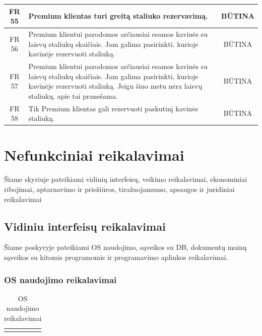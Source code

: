 \documentclass{VUMIFPSkursinis}
\begin{document}
{{{{{\begin{center}
\begin{table}[H]
\begin{tabular}{|p{2cm}|p{}|p{}|}
	\hline 	
		\multicolumn{1}{|c|}{FR 55}&
		{Premium klientas turi greitą staliuko rezervavimą.}&
		\multicolumn{1}{|c|}{BŪTINA}\\
				
	\hline 	
		\multicolumn{1}{|c|}{FR 56}&
		{Premium klientui parodomos arčiausiai esamos kavinės su laisvų staliukų skaičiais. Jam galima pasirinkti, kurioje kavinėje rezervuoti staliuką.}&
		\multicolumn{1}{|c|}{BŪTINA}\\
				
	\hline 	
		\multicolumn{1}{|c|}{FR 57}&
		{Premium klientui parodomos arčiausiai esamos kavinės su laisvų staliukų skaičiais. Jam galima pasirinkti, kurioje kavinėje rezervuoti staliuką. Jeigu šiuo metu nėra laisvų staliukų, apie tai pranešama.}&
		\multicolumn{1}{|c|}{BŪTINA}\\
				
	\hline 	
		\multicolumn{1}{|c|}{FR 58}&
		{Tik Premium klientas gali rezervuoti paskutinį kavinės staliuką.}&
		\multicolumn{1}{|c|}{BŪTINA}\\
				
	\hline

	\end{tabular}
	
	\label{table:Premiumklientogalimybės}		
	\end{table}

\end{center}

\pagebreak
\section{Nefunkciniai reikalavimai}
Šiame skyriuje pateikiami vidinių interfeisų, veikimo reikalavimai, ekonominiai ribojimai, aptarnavimo ir priežiūros, tiražuojamumo, apsaugos ir juridiniai reikalavimai
\subsection{Vidiniu interfeisų reikalavimai}
Šiame poskyryje pateikiami OS naudojimo, sąveikos su DB, dokumentų mainų sąveikos su kitomis programomis ir programavimo aplinkos reikalavimai.
\subsubsection{OS naudojimo reikalavimai}

\begin{center}
	\begin{table}[H]
	\caption{OS naudojimo reikalavimai}
	\begin{tabular}{|p{2cm}|p{}|p{}|}
	\hline
	    \rowcolor{lightgray}
		\multicolumn{3}{|c|}{Apsaugos reikalavimai}\\
		

\end{tabular}
\end{table}
\end{center}}}}}}
\end{document}
